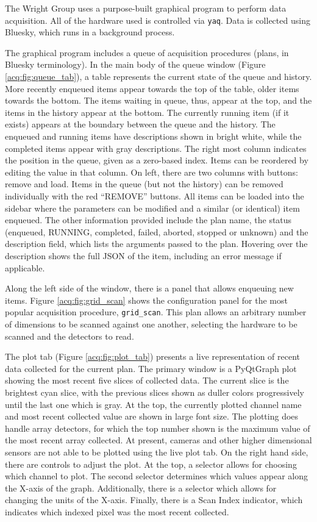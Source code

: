 \documentclass[11pt, full]{article}
\newcommand\yaq{\texttt{yaq}}
\begin{document}
The Wright Group uses a purpose-built graphical program to perform data acquisition.
All of the hardware used is controlled via \yaq{}.
Data is collected using Bluesky, which runs in a background process.

The graphical program includes a queue of acquisition procedures (plans, in Bluesky terminology).
In the main body of the queue window (Figure \ref{acq:fig:queue_tab}), a table represents the current state of the queue and history.
More recently enqueued items appear towards the top of the table, older items towards the bottom.
The items waiting in queue, thus, appear at the top, and the items in the history appear at the bottom.
The currently running item (if it exists) appears at the boundary between the queue and the history.
The enqueued and running items have descriptions shown in bright white, while the completed items appear with gray descriptions.
The right most column indicates the position in the queue, given as a zero-based index.
Items can be reordered by editing the value in that column.
On left, there are two columns with buttons: remove and load.
Items in the queue (but not the history) can be removed individually with the red ``REMOVE'' buttons.
All items can be loaded into the sidebar where the parameters can be modified and a similar (or identical) item enqueued.
The other information provided include the plan name, the status (enqueued, RUNNING, completed, failed, aborted, stopped or unknown) and the description field, which lists the arguments passed to the plan.
Hovering over the description shows the full JSON of the item, including an error message if applicable.

Along the left side of the window, there is a panel that allows enqueuing new items.
Figure \ref{acq:fig:grid_scan} shows the configuration panel for the most popular acquisition procedure, \texttt{grid\_scan}.
This plan allows an arbitrary number of dimensions to be scanned against one another, selecting the hardware to be scanned and the detectors to read.

The plot tab (Figure \ref{acq:fig:plot_tab}) presents a live representation of recent data collected for the current plan.
The primary window is a PyQtGraph \cite{pyqtgraph} plot showing the most recent five slices of collected data.
The current slice is the brightest cyan slice, with the previous slices shown as duller colors progressively until the last one which is gray.
At the top, the currently plotted channel name and most recent collected value are shown in large font size.
The plotting does handle array detectors, for which the top number shown is the maximum value of the most recent array collected.
At present, cameras and other higher dimensional sensors are not able to be plotted using the live plot tab.
On the right hand side, there are controls to adjust the plot.
At the top, a selector allows for choosing which channel to plot.
The second selector determines which values appear along the X-axis of the graph.
Additionally, there is a selector which allows for changing the units of the X-axis.
Finally, there is a Scan Index indicator, which indicates which indexed pixel was the most recent collected.
\end{document}
